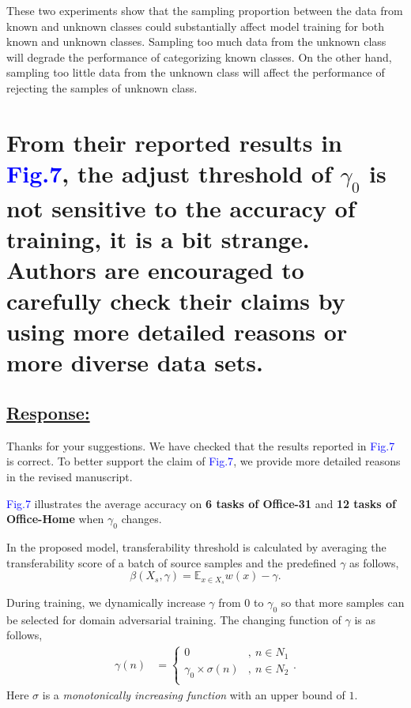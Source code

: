 These two experiments show that the sampling proportion between the data from known and unknown classes could substantially affect model training for both known and unknown classes.
Sampling too much data from the unknown class will degrade the performance of categorizing known classes.
On the other hand, sampling too little data from the unknown class will affect the performance of rejecting the samples of unknown class.

\section{From their reported results in \textcolor{blue}{Fig.7}, the adjust threshold of $\gamma_0$ is not sensitive to the accuracy of training, it is a bit strange.  
Authors are encouraged to carefully check their claims by using more detailed reasons or more diverse data sets. }
\label{Question: threshold}
\subsection*{\underline{\textbf{Response:}}}

Thanks for your suggestions.
We have checked that the results reported in \textcolor{blue}{Fig.7} is correct.
To better support the claim of \textcolor{blue}{Fig.7}, we provide more detailed reasons in the revised manuscript.

\textcolor{blue}{Fig.7} illustrates the average accuracy on \textbf{6 tasks of Office-31} and \textbf{12 tasks of Office-Home} when $\gamma_0$ changes.


In the proposed model, transferability threshold is calculated by averaging the transferability score of a batch of source samples and the predefined $\gamma$ as follows,
\begin{equation}
    \label{eq: transferability thresholded}
    \beta(X_s, \gamma) = \mathbb{E}_{x \in X_s} w(x) - \gamma.
\end{equation}

During training, we dynamically increase $\gamma$ from $0$ to $\gamma_0$ so that more samples can be selected for domain adversarial training.
The changing function of $\gamma$ is as follows,
\begin{equation}
    \label{eq: dynamic tolerable range}
    \begin{split}
        \gamma(n) &=
        \begin{cases}
            0 & ,\: n \in N_1 \\
            \gamma_0 \times  \sigma(n) & ,\: n\in N_2 \\
        \end{cases}.
    \end{split}
\end{equation}
Here $\sigma$ is a \textit{monotonically increasing function} with an upper bound of $1$.

